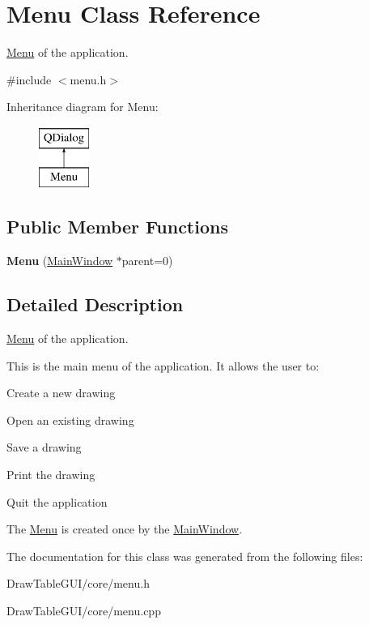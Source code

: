 \hypertarget{classMenu}{}\section{Menu Class Reference}
\label{classMenu}


\hyperlink{classMenu}{Menu} of the application.  




{\ttfamily \#include $<$menu.\+h$>$}

Inheritance diagram for Menu\+:\begin{figure}[H]
\begin{center}
\leavevmode
\includegraphics[height=2.000000cm]{classMenu}
\end{center}
\end{figure}
\subsection*{Public Member Functions}
\begin{DoxyCompactItemize}
\item 
\hypertarget{classMenu_ab934c6069cbf2b788ed6117685f32a8b}{}{\bfseries Menu} (\hyperlink{classMainWindow}{Main\+Window} $\ast$parent=0)\label{classMenu_ab934c6069cbf2b788ed6117685f32a8b}

\end{DoxyCompactItemize}


\subsection{Detailed Description}
\hyperlink{classMenu}{Menu} of the application. 

This is the main menu of the application. It allows the user to\+:
\begin{DoxyItemize}
\item Create a new drawing
\item Open an existing drawing
\item Save a drawing
\item Print the drawing
\item Quit the application
\end{DoxyItemize}

The \hyperlink{classMenu}{Menu} is created once by the \hyperlink{classMainWindow}{Main\+Window}. 

The documentation for this class was generated from the following files\+:\begin{DoxyCompactItemize}
\item 
Draw\+Table\+G\+U\+I/core/menu.\+h\item 
Draw\+Table\+G\+U\+I/core/menu.\+cpp\end{DoxyCompactItemize}
